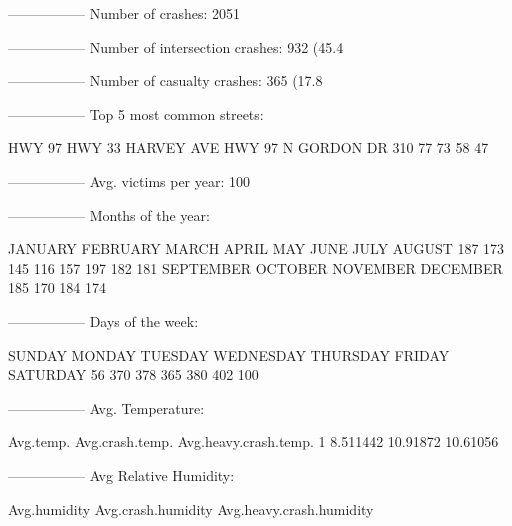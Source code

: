 \documentclass[11pt, a4paper]{article}
\begin{document}
\begin{Schunk}
\begin{Soutput}
-----------------
Number of crashes: 2051
\end{Soutput}
\begin{Soutput}
-----------------
Number of intersection crashes: 932 (45.4%
\end{Soutput}
\begin{Soutput}
-----------------
Number of casualty crashes: 365 (17.8%
\end{Soutput}
\begin{Soutput}
-----------------
Top 5 most common streets:
\end{Soutput}
\begin{Soutput}
    HWY 97     HWY 33 HARVEY AVE   HWY 97 N  GORDON DR 
       310         77         73         58         47 
\end{Soutput}
\begin{Soutput}
-----------------
Avg. victims per year: 100
\end{Soutput}
\begin{Soutput}
-----------------
Months of the year:
\end{Soutput}
\begin{Soutput}
  JANUARY  FEBRUARY     MARCH     APRIL       MAY      JUNE      JULY    AUGUST 
      187       173       145       116       157       197       182       181 
SEPTEMBER   OCTOBER  NOVEMBER  DECEMBER 
      185       170       184       174 
\end{Soutput}
\begin{Soutput}
-----------------
Days of the week:
\end{Soutput}
\begin{Soutput}
   SUNDAY    MONDAY   TUESDAY WEDNESDAY  THURSDAY    FRIDAY  SATURDAY 
       56       370       378       365       380       402       100 
\end{Soutput}
\begin{Soutput}
-----------------
Avg. Temperature:
\end{Soutput}
\begin{Soutput}
  Avg.temp. Avg.crash.temp. Avg.heavy.crash.temp.
1  8.511442        10.91872              10.61056
\end{Soutput}
\begin{Soutput}
-----------------
Avg Relative Humidity:
\end{Soutput}
\begin{Soutput}
  Avg.humidity Avg.crash.humidity Avg.heavy.crash.humidity

\end{Soutput}
\end{Schunk}
\end{document}
